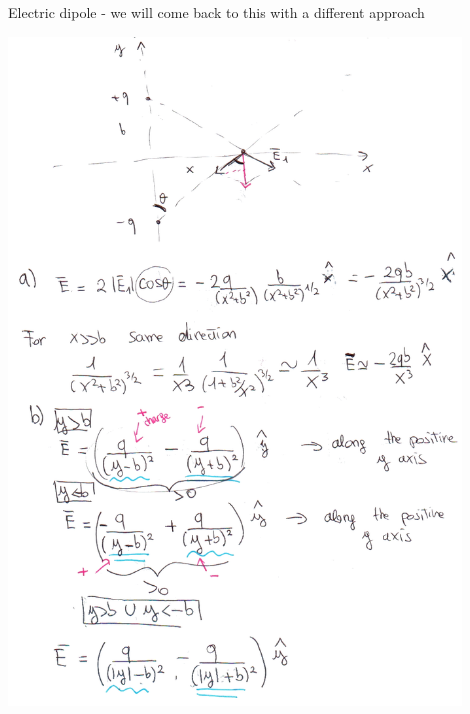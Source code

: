 \documentclass{esg8022pset}
\begin{document}
\begin{solution}
  Electric dipole - we will come back to this with a different approach
  \begin{center}\includegraphics[width=0.9\textwidth]{ps01_sol_07_1}\end{center}

\end{solution}
\end{document}
